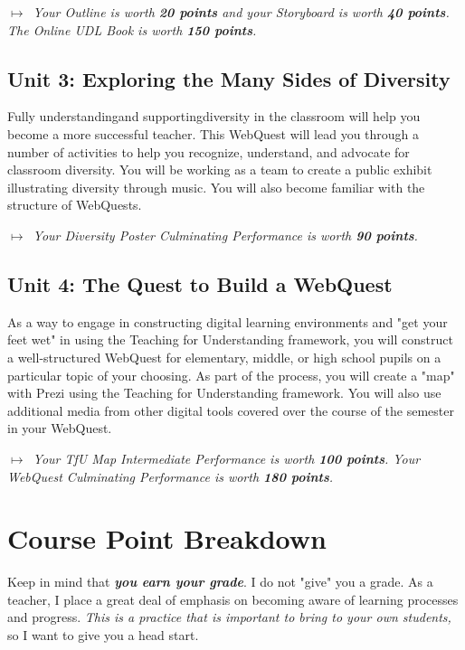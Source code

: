 \documentclass{tufte-handout}
\begin{document}
\medskip\noindent\textit{$\mapsto$~Your Outline is worth \textbf{20 points} and your Storyboard is worth \textbf{40 points}. The Online UDL Book is worth \textbf{150 points}.}

\subsection{Unit 3: Exploring the Many Sides of Diversity}

Fully understanding\textemdash{}and supporting\textemdash{}diversity in the classroom will help you become a more successful teacher. This WebQuest will lead you through a number of activities to help you recognize, understand, and advocate for classroom diversity. You will be working as a team to create a public exhibit illustrating diversity through music. You will also become familiar with the structure of WebQuests.

\medskip\noindent\textit{$\mapsto$~Your Diversity Poster Culminating Performance is worth \textbf{90 points}.}

\subsection{Unit 4: The Quest to Build a WebQuest}

As a way to engage in constructing digital learning environments and "get your feet wet" in using the Teaching for Understanding framework, you will construct a well-structured WebQuest for elementary, middle, or high school pupils on a particular topic of your choosing. As part of the process, you will create a "map" with Prezi using the Teaching for Understanding framework. You will also use additional media from other digital tools covered over the course of the semester in your WebQuest.

\medskip\noindent\textit{$\mapsto$~Your TfU Map Intermediate Performance is worth \textbf{100 points}. Your WebQuest Culminating Performance is worth \textbf{180 points}.}

\section{Course Point Breakdown}

Keep in mind that \emph{\textbf{you earn your grade}}. I do not "give" you a grade. As a teacher, I place a great deal of emphasis on becoming aware of learning processes and progress. \emph{This is a practice that is important to bring to your own students,} so I want to give you a head start.
\end{document}
